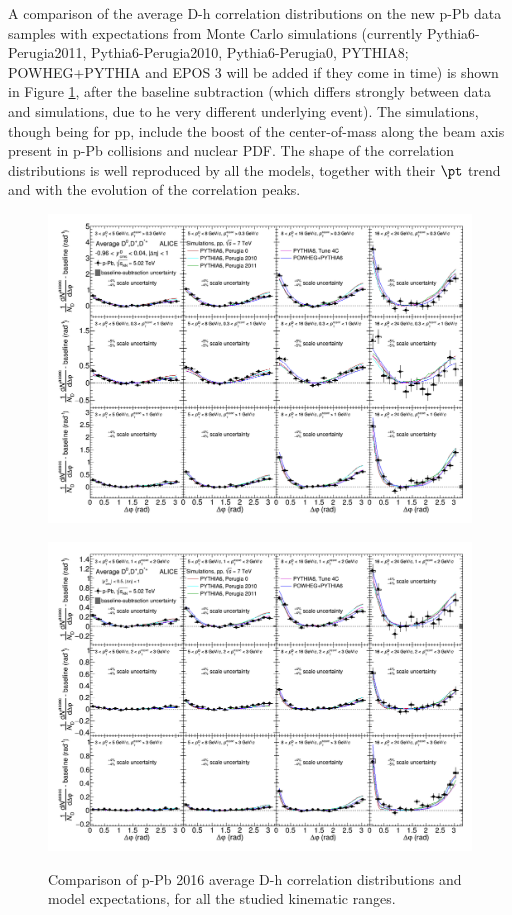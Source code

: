A comparison of the average D-h correlation distributions on the new p-Pb data samples with expectations from Monte Carlo simulations (currently Pythia6-Perugia2011, Pythia6-Perugia2010, Pythia6-Perugia0, PYTHIA8; POWHEG+PYTHIA and EPOS 3 will be added if they come in time) is shown in Figure \ref{fig:CfrAverageModel}, after the baseline subtraction (which differs strongly between data and simulations, due to he very different underlying event). The simulations, though being for pp, include the boost of the center-of-mass along the beam axis present in p-Pb collisions and nuclear PDF. The shape of the correlation distributions is well reproduced by all the models, together with their $\pt$ trend and with the evolution of the correlation peaks.

\begin{figure}[!htbp]
\centering
{\includegraphics[width=1.3\linewidth, angle=90]{figures/CfrPPandModels/CorrelationppMC4x6_1New.png}}
\end{figure}
\begin{figure}[!htbp]
\centering
{\includegraphics[width=1.3\linewidth, angle=90]{figures/CfrPPandModels/CorrelationppMC4x6_2New.png}}
\caption{Comparison of p-Pb 2016 average D-h correlation distributions and model expectations, for all the studied kinematic ranges.}
\label{fig:CfrAverageModel}
\end{figure}

